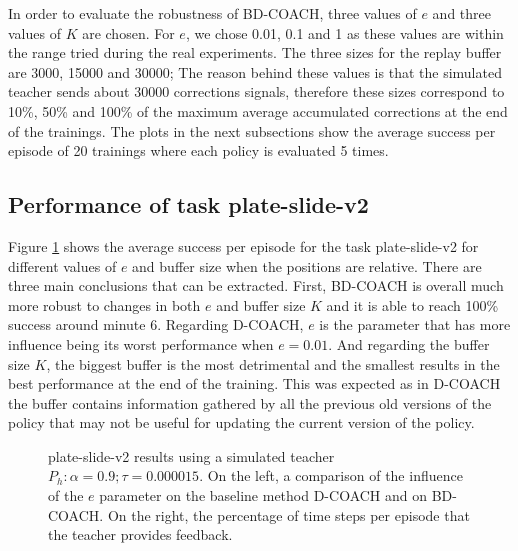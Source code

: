 In order to evaluate the robustness of BD-COACH, three values of $e$ and three values of $K$ are chosen. For $e$, we chose 0.01, 0.1 and 1 as these values are within the range tried during the real experiments. The three sizes for the replay buffer are 3000, 15000 and 30000; The reason behind these values is that the simulated teacher sends about 30000 corrections signals, therefore these sizes correspond to 10\%, 50\%  and 100\% of the maximum average accumulated corrections at the end of the trainings. The plots in the next subsections show the average success per episode of 20 trainings where each policy is evaluated 5 times.

\subsection{Performance of task plate-slide-v2}
\label{subsection:Performance of task plate_slide_v2}




Figure \ref{fig:results_plate_slide_buffer_e} shows the average success per episode for the task plate-slide-v2 for different values of $e$ and buffer size when the positions are relative. There are three main conclusions that can be extracted. First, BD-COACH is overall much more robust to changes in both $e$ and buffer size $K$ and it is able to reach 100\% success around minute 6. Regarding D-COACH, $e$ is the parameter that has more influence being its worst performance when $e=0.01$. And regarding the buffer size $K$, the biggest buffer is the most detrimental and the smallest results in the best performance at the end of the training.
This was expected as in D-COACH the buffer contains information gathered by all the previous old versions of the policy that may not be useful for updating the current version of the policy.

 \begin{figure}[H]
  \centering
   \hfill
  \caption{plate-slide-v2 results using a simulated teacher $P_h: \alpha = 0.9; \tau =  0.000015$. On the left, a comparison of the influence of the $e$ parameter on the baseline method D-COACH and on BD-COACH. On the right, the percentage of time steps per episode that the teacher  provides feedback.}
  \label{fig:results_plate_slide_buffer_e}
\end{figure}



